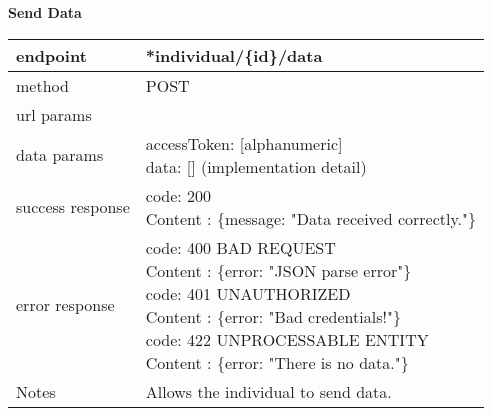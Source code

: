 	\textbf{Send Data} \\

	\begin{tabularx}{\linewidth}{| l| l }
		\hline
		endpoint & *individual/\{id\}/data \\
		\hline
		method & POST \\
		\hline
		url params & \\
		\hline
		data params &
		\parbox{0.7\textwidth}{
			\bigskip
			accessToken: [alphanumeric]\\
			data: [] (implementation detail)\\
			\bigskip
		} \\
		\hline
		success response &
		\parbox{0.7\textwidth}{
			\bigskip
			code: 200\\
			Content : \{message: "Data received correctly."\}
			\bigskip
		} \\
		\hline
		error response &
		\parbox{0.7\textwidth}{
			\bigskip
			code: 400 BAD REQUEST \\
			Content : \{error: "JSON parse error"\}\\
			code: 401 UNAUTHORIZED \\
			Content : \{error: "Bad credentials!"\}\\
			code: 422 UNPROCESSABLE ENTITY \\
			Content : \{error: "There is no data."\}
			\bigskip
		} \\
		\hline
		Notes & 
		\parbox{0.7\textwidth}{
			\bigskip Allows the individual to send data.
		\bigskip}  \\
		\hline
	\end{tabularx}